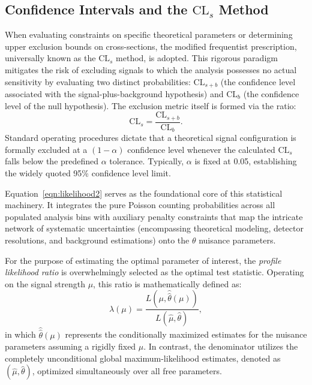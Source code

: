 \subsection{Confidence Intervals and the $\text{CL}_s$ Method}
\label{subsec:CL}

When evaluating constraints on specific theoretical parameters or determining upper exclusion bounds on cross-sections, the modified frequentist prescription, universally known as the $\text{CL}_s$ method, is adopted. This rigorous paradigm mitigates the risk of excluding signals to which the analysis possesses no actual sensitivity by evaluating two distinct probabilities: $\text{CL}_{s+b}$ (the confidence level associated with the signal-plus-background hypothesis) and $\text{CL}_b$ (the confidence level of the null hypothesis). The exclusion metric itself is formed via the ratio:
\begin{equation}
\text{CL}_s = \frac{\text{CL}_{s+b}}{\text{CL}_b}.
\end{equation}
Standard operating procedures dictate that a theoretical signal configuration is formally excluded at a $(1-\alpha)$ confidence level whenever the calculated $\text{CL}_s$ falls below the predefined $\alpha$ tolerance. Typically, $\alpha$ is fixed at 0.05, establishing the widely quoted 95\% confidence level limit.

Equation~\eqref{eqn:likelihood2} serves as the foundational core of this statistical machinery. It integrates the pure Poisson counting probabilities across all populated analysis bins with auxiliary penalty constraints that map the intricate network of systematic uncertainties (encompassing theoretical modeling, detector resolutions, and background estimations) onto the $\theta$ nuisance parameters.

For the purpose of estimating the optimal parameter of interest, the \textit{profile likelihood ratio} is overwhelmingly selected as the optimal test statistic. Operating on the signal strength $\mu$, this ratio is mathematically defined as:
\begin{equation}
\lambda(\mu) =
\frac{L(\mu, \hat{\hat{\theta}}(\mu))}
     {L(\hat{\mu}, \hat{\theta})},
\end{equation}
in which $\hat{\hat{\theta}}(\mu)$ represents the conditionally maximized estimates for the nuisance parameters assuming a rigidly fixed $\mu$. In contrast, the denominator utilizes the completely unconditional global maximum-likelihood estimates, denoted as $(\hat{\mu}, \hat{\theta})$, optimized simultaneously over all free parameters.

